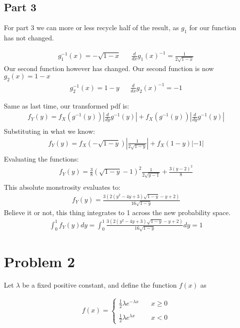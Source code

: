 \documentclass{article}
\begin{document}
\subsection*{Part 3}
For part 3 we can more or less recycle half of the result, as $g_1$ for our function has not changed.

\begin{align*}
g_{1}^{-1}(x) =-\sqrt{1-x} && \frac{d}{dx} g_{1}(x)^{-1} = \frac{1}{2\sqrt{1-x}}
\end{align*}
Our second function however has changed. Our second function is now $g_2(x)=1-x$
\begin{align*}
g_{2}^{-1}(x) =1-y && \frac{d}{dx} g_{2}(x)^{-1} = -1
\end{align*}

Same as last time, our transformed pdf is:
\begin{align*}
f_Y(y) = f_X(g^{-1}(y))|\frac{d}{dy}g^{-1}(y)| + f_X(g^{-1}(y))|\frac{d}{dy}g^{-1}(y)| \\
\end{align*}
Substituting in what we know:
\begin{align*}
f_Y(y) = f_X(-\sqrt{1-y})|\frac{1}{2\sqrt{1-y}}| + f_X(1-y)|-1| \\
\end{align*}
Evaluating the functions:
\begin{align*}
f_Y(y) = \frac{3}{8}(\sqrt{1-y}-1)^2 \frac{1}{2\sqrt{y-1}} + \frac{3(y-2)^2}{8} \\
\end{align*}
This absolute monstrosity evaluates to:
\begin{align*}
\boxed{f_Y(y) = \frac{3(2(y^2-4y+3)\sqrt{1-y}-y+2)}{16\sqrt{1-y}} }
\end{align*}
Believe it or not, this thing integrates to 1 across the new probability space.
\begin{align*}
\boxed{\int_{0}^{1} f_Y(y) dy = \int_{0}^{1} \frac{3(2(y^2-4y+3)\sqrt{1-y}-y+2)}{16\sqrt{1-y}}dy = 1}
\end{align*}


\clearpage

\section*{Problem 2}
Let $\lambda$ be a fixed positive constant, and define the function $f(x)$ as

\begin{align*}
f(x) = \left\{
        \begin{array}{ll}
            \tfrac{1}{2} \lambda e^{-\lambda x} & \quad x \geq 0 \\
            \\
            \tfrac{1}{2} \lambda e^{\lambda x} & \quad x < 0
        \end{array}
    \right.
\end{align*}
\end{document}
